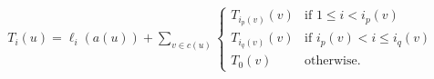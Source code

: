 \documentclass[a4paper,english,numberwithinsect]{eurocg18}
\newcommand{\maxsped}{\ensuremath{\textsc{MaxSPED}}\xspace}
\newcommand{\sollong}{\ensuremath{\textit{long}}\xspace}
\newcommand{\solmid}{\ensuremath{\textit{mid}}\xspace}
\newcommand{\solshort}{\ensuremath{\textit{short}}\xspace}
\begin{document}
\begin{align}
\label{rec:cactus_articulation}
T_i(u) = \ell_i(a(u)) + \sum_{v \in c(u)}
\begin{cases}
%
%
T_{i_p(v)}(v) & \text{if } 1 \le i < i_p(v)\\ %
T_{i_q(v)}(v) & \text{if } i_p(v) < i \leq i_q(v) \\
T_{0}(v) & \text{otherwise.}
\end{cases}
\end{align}
\end{document}
